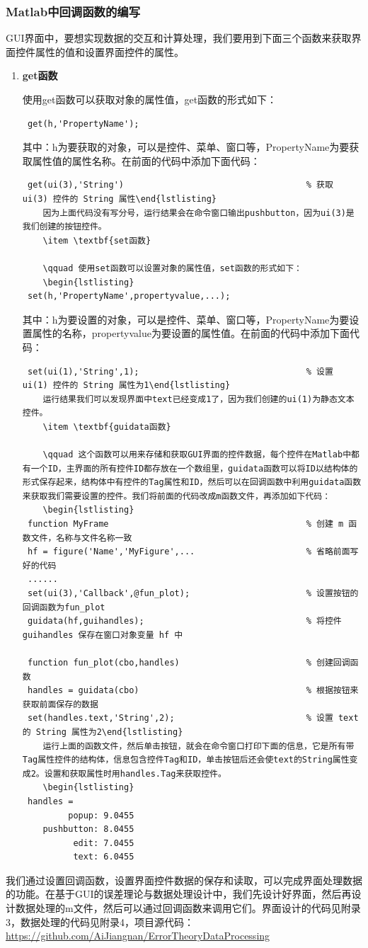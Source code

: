 \subsubsection{Matlab中回调函数的编写}
GUI界面中，要想实现数据的交互和计算处理，我们要用到下面三个函数来获取界面控件属性的值和设置界面控件的属性。
\begin{enumerate}
	\item \textbf{get函数}

	\qquad 使用get函数可以获取对象的属性值，get函数的形式如下：
	\begin{lstlisting}
 get(h,'PropertyName');\end{lstlisting}
 	其中：h为要获取的对象，可以是控件、菜单、窗口等，PropertyName为要获取属性值的属性名称。在前面的代码中添加下面代码：
	 \begin{lstlisting}
 get(ui(3),'String')									% 获取 ui(3) 控件的 String 属性\end{lstlisting}
 	因为上面代码没有写分号，运行结果会在命令窗口输出pushbutton，因为ui(3)是我们创建的按钮控件。
	\item \textbf{set函数}

	\qquad 使用set函数可以设置对象的属性值，set函数的形式如下：
	\begin{lstlisting}
 set(h,'PropertyName',propertyvalue,...);\end{lstlisting}
 	其中：h为要设置的对象，可以是控件、菜单、窗口等，PropertyName为要设置属性的名称，propertyvalue为要设置的属性值。在前面的代码中添加下面代码：
	 \begin{lstlisting}
 set(ui(1),'String',1);									% 设置 ui(1) 控件的 String 属性为1\end{lstlisting}
 	运行结果我们可以发现界面中text已经变成1了，因为我们创建的ui(1)为静态文本控件。
	\item \textbf{guidata函数}

	\qquad 这个函数可以用来存储和获取GUI界面的控件数据，每个控件在Matlab中都有一个ID，主界面的所有控件ID都存放在一个数组里，guidata函数可以将ID以结构体的形式保存起来，结构体中有控件的Tag属性和ID，然后可以在回调函数中利用guidata函数来获取我们需要设置的控件。我们将前面的代码改成m函数文件，再添加如下代码：
	\begin{lstlisting}
 function MyFrame										% 创建 m 函数文件，名称与文件名称一致
 hf = figure('Name','MyFigure',...						% 省略前面写好的代码
 ......
 set(ui(3),'Callback',@fun_plot);						% 设置按钮的回调函数为fun_plot
 guidata(hf,guihandles);								% 将控件 guihandles 保存在窗口对象变量 hf 中

 function fun_plot(cbo,handles)							% 创建回调函数
 handles = guidata(cbo)									% 根据按钮来获取前面保存的数据
 set(handles.text,'String',2);							% 设置 text 的 String 属性为2\end{lstlisting}
 	运行上面的函数文件，然后单击按钮，就会在命令窗口打印下面的信息，它是所有带Tag属性控件的结构体，信息包含控件Tag和ID，单击按钮后还会使text的String属性变成2。设置和获取属性时用handles.Tag来获取控件。
	\begin{lstlisting}
 handles = 
         popup: 9.0455
    pushbutton: 8.0455
          edit: 7.0455
          text: 6.0455\end{lstlisting}
\end{enumerate}

我们通过设置回调函数，设置界面控件数据的保存和读取，可以完成界面处理数据的功能。在基于GUI的误差理论与数据处理设计中，我们先设计好界面，然后再设计数据处理的m文件，然后可以通过回调函数来调用它们。界面设计的代码见附录3，数据处理的代码见附录4，项目源代码：\url{https://github.com/AiJiangnan/ErrorTheoryDataProcessing}
